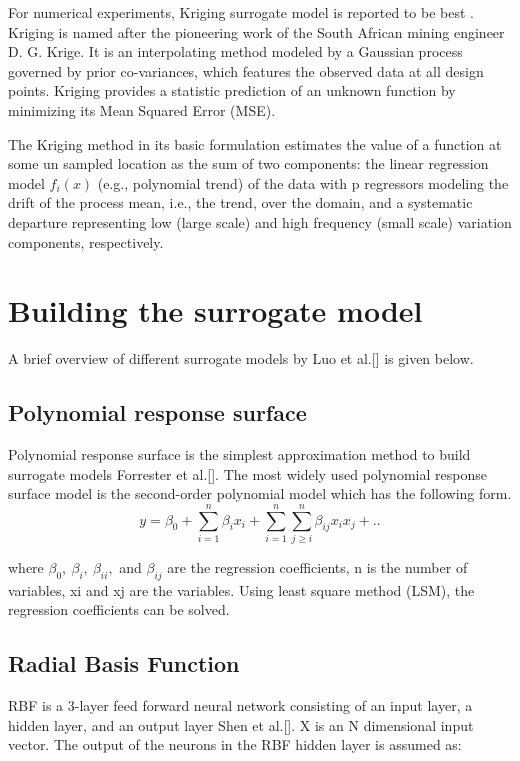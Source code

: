 For numerical experiments, Kriging surrogate model is reported to be best . Kriging is named after the pioneering work of the South African mining engineer D. G. Krige. It is an interpolating method modeled by a Gaussian process governed by prior co-variances, which features the observed data at all design points. Kriging provides a statistic prediction of an unknown function by minimizing its Mean Squared Error (MSE).

The Kriging method in its basic formulation estimates the value of a function at some un sampled location as the sum of two components: the linear regression model $ f_i (x) $ (e.g., polynomial trend) of the data with p regressors modeling the drift of the process mean, i.e., the trend, over the domain, and a systematic departure representing low (large scale) and high frequency (small scale) variation components, respectively.

\section{Building the surrogate model}
A brief overview of different surrogate models by Luo et al.[] is given below.
\subsection{Polynomial response surface}
Polynomial response surface is the simplest approximation method to build surrogate models Forrester et al.[]. The most widely used polynomial response surface model is the second-order polynomial model which has the following form.
\begin{equation}
y = \beta _{0} + \sum_{i=1}^{n} \beta _{i} x_{i} + \sum_{i=1}^{n} \sum_{j \ge i}^{n} \beta _{ij} x_{i} x_{j} + ..
\end{equation}

where $ \beta _{0},\ \beta_{i},\ \beta _{ii},$ and $ \beta _{ij} $ are the regression coefficients, n is the number of variables, xi and xj are the variables. Using least square method (LSM), the regression coefficients can be solved.

\subsection{Radial Basis Function}
RBF is a 3-layer feed forward neural network consisting of an input layer, a hidden layer, and an output layer Shen et al.[]. X is an N dimensional input vector. The output of the neurons in the RBF hidden layer is assumed as:

